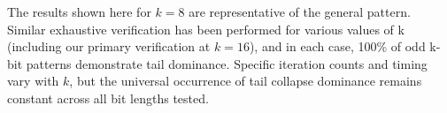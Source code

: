\documentclass[10pt,letterpaper]{article}
\begin{document}
\vspace{1em}
The results shown here for $k=8$ are representative of the general pattern. Similar exhaustive verification has been performed for various values of k (including our primary verification at $k=16$), and in each case, 100\% of odd k-bit patterns demonstrate tail dominance. Specific iteration counts and timing vary with $k$, but the universal occurrence of tail collapse dominance remains constant across all bit lengths tested.
\end{document}
